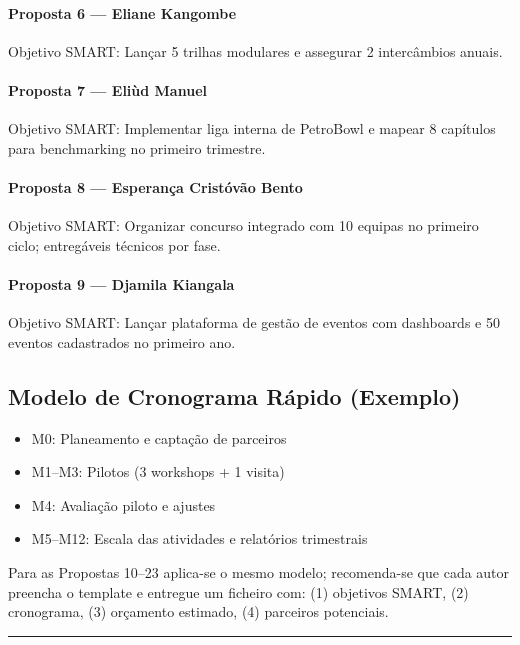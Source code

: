 \documentclass[12pt,a4paper]{article}
\begin{document}
\paragraph{Proposta 6 — Eliane Kangombe}
Objetivo SMART: Lançar 5 trilhas modulares e assegurar 2 intercâmbios anuais.

\paragraph{Proposta 7 — Eliùd Manuel}
Objetivo SMART: Implementar liga interna de PetroBowl e mapear 8 capítulos para benchmarking no primeiro trimestre.

\paragraph{Proposta 8 — Esperança Cristóvão Bento}
Objetivo SMART: Organizar concurso integrado com 10 equipas no primeiro ciclo; entregáveis técnicos por fase.

\paragraph{Proposta 9 — Djamila Kiangala}
Objetivo SMART: Lançar plataforma de gestão de eventos com dashboards e 50 eventos cadastrados no primeiro ano.

\vspace{0.5cm}
\subsection*{Modelo de Cronograma Rápido (Exemplo)}
\begin{itemize}
    \item M0: Planeamento e captação de parceiros
    \item M1–M3: Pilotos (3 workshops + 1 visita)
    \item M4: Avaliação piloto e ajustes
    \item M5–M12: Escala das atividades e relatórios trimestrais
\end{itemize}

\vspace{0.5cm}
\noindent Para as Propostas 10–23 aplica-se o mesmo modelo; recomenda-se que cada autor preencha o template e entregue um ficheiro com: (1) objetivos SMART, (2) cronograma, (3) orçamento estimado, (4) parceiros potenciais.

\vspace{1cm}
\textcolor{spe-secondary}{\hspace{0.5cm}\rule{\linewidth}{0.5pt}}
\end{document}
